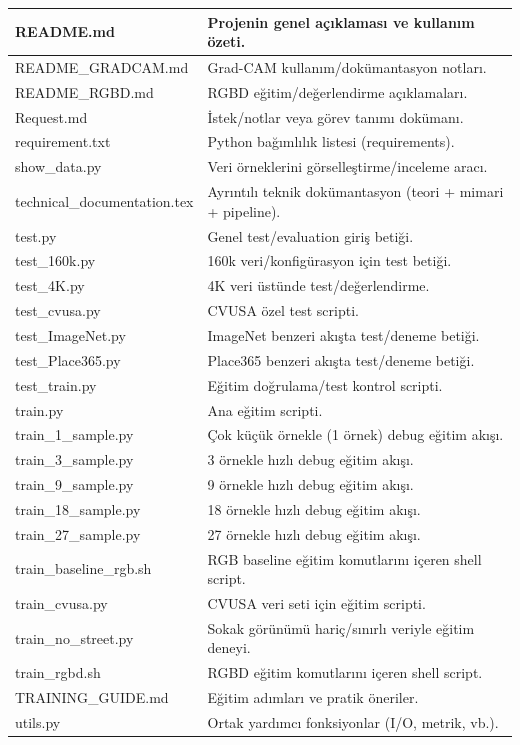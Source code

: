 \documentclass[11pt,a4paper]{article}
\begin{document}
\begin{longtable}{|p{}|p{}|}
\hline
README.md & Projenin genel açıklaması ve kullanım özeti. \\
\hline
README_GRADCAM.md & Grad-CAM kullanım/dokümantasyon notları. \\
\hline
README_RGBD.md & RGBD eğitim/değerlendirme açıklamaları. \\
\hline
Request.md & İstek/notlar veya görev tanımı dokümanı. \\
\hline
requirement.txt & Python bağımlılık listesi (requirements). \\
\hline
show_data.py & Veri örneklerini görselleştirme/inceleme aracı. \\
\hline
technical_documentation.tex & Ayrıntılı teknik dokümantasyon (teori + mimari + pipeline). \\
\hline
test.py & Genel test/evaluation giriş betiği. \\
\hline
test_160k.py & 160k veri/konfigürasyon için test betiği. \\
\hline
test_4K.py & 4K veri üstünde test/değerlendirme. \\
\hline
test_cvusa.py & CVUSA özel test scripti. \\
\hline
test_ImageNet.py & ImageNet benzeri akışta test/deneme betiği. \\
\hline
test_Place365.py & Place365 benzeri akışta test/deneme betiği. \\
\hline
test_train.py & Eğitim doğrulama/test kontrol scripti. \\
\hline
train.py & Ana eğitim scripti. \\
\hline
train_1_sample.py & Çok küçük örnekle (1 örnek) debug eğitim akışı. \\
\hline
train_3_sample.py & 3 örnekle hızlı debug eğitim akışı. \\
\hline
train_9_sample.py & 9 örnekle hızlı debug eğitim akışı. \\
\hline
train_18_sample.py & 18 örnekle hızlı debug eğitim akışı. \\
\hline
train_27_sample.py & 27 örnekle hızlı debug eğitim akışı. \\
\hline
train_baseline_rgb.sh & RGB baseline eğitim komutlarını içeren shell script. \\
\hline
train_cvusa.py & CVUSA veri seti için eğitim scripti. \\
\hline
train_no_street.py & Sokak görünümü hariç/sınırlı veriyle eğitim deneyi. \\
\hline
train_rgbd.sh & RGBD eğitim komutlarını içeren shell script. \\
\hline
TRAINING_GUIDE.md & Eğitim adımları ve pratik öneriler. \\
\hline
utils.py & Ortak yardımcı fonksiyonlar (I/O, metrik, vb.). \\
\hline
\end{longtable}
\end{document}
